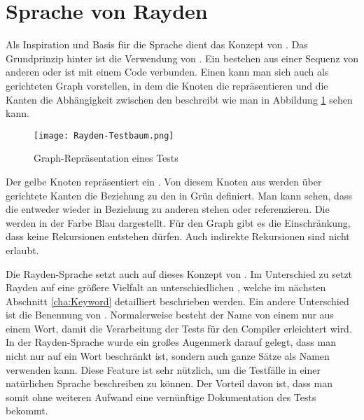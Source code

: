 
\section{Sprache von Rayden}

Als Inspiration und Basis für die Sprache dient das Konzept von . Das Grundprinzip hinter  ist die Verwendung von . Ein  bestehen aus einer Sequenz von anderen  oder ist mit einem Code verbunden. Einen  kann man sich auch als gerichteten Graph vorstellen, in dem die Knoten die  repräsentieren und die Kanten die Abhängigkeit zwischen den  beschreibt wie man in Abbildung \ref{fig:test-graph} sehen kann. 

\begin{figure}[h]
\centering
\texttt{[image: Rayden-Testbaum.png]}
\caption{Graph-Repräsentation eines Tests}
\label{fig:test-graph}
\end{figure}

\SuperPar
Der gelbe Knoten repräsentiert ein . Von diesem Knoten aus werden über gerichtete Kanten die Beziehung zu den  in Grün definiert. Man kann sehen, dass die  entweder wieder in Beziehung zu anderen  stehen oder  referenzieren. Die  werden in der Farbe Blau dargestellt. Für den Graph gibt es die Einschränkung, dass keine Rekursionen entstehen dürfen. Auch indirekte Rekursionen sind nicht erlaubt.

\SuperPar
Die Rayden-Sprache setzt auch auf dieses Konzept von . Im Unterschied zu  setzt Rayden auf eine größere Vielfalt an unterschiedlichen , welche im nächsten Abschnitt \ref{cha:Keyword} detailliert beschrieben werden. Ein andere Unterschied ist die Benennung von . Normalerweise besteht der Name von einem  nur aus einem Wort, damit die Verarbeitung der Tests für den Compiler erleichtert wird. In der Rayden-Sprache wurde ein großes Augenmerk darauf gelegt, dass man nicht nur auf ein Wort beschränkt ist, sondern auch ganze Sätze als Namen verwenden kann. Diese Feature ist sehr nützlich, um die Testfälle in einer natürlichen Sprache beschreiben zu können. Der Vorteil davon ist, dass man somit ohne weiteren Aufwand eine vernünftige Dokumentation des Tests bekommt.

